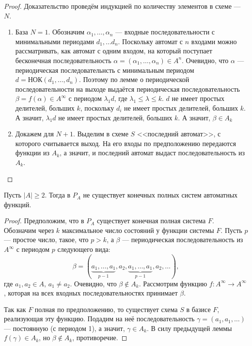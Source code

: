 \begin{proof}
    Доказательство проведём индукцией по количеству элементов в схеме --- $N$.
    \begin{enumerate}
        \item База $N=1$. Обозначим $\alpha_1, \ldots, \alpha_n$ --- входные последовательности с минимальными периодами $d_1, \ldots d_n$. Поскольку автомат с $n$ входами можно рассматривать, как автомат с одним входом, на который поступает бесконечная последовательность $\alpha = (\alpha_1, \ldots, \alpha_n) \in A^n$. Очевидно, что $\alpha$ --- периодическая последовательнсть с минимальным периодом $d= НОК(d_1, \ldots, d_n)$. Поэтому по лемме о периодической последовательности на выходе выдаётся периодическая последовательность $\beta = f(\alpha) \in A^{\infty}$ с периодом $\lambda_1 d$, где $\lambda_1 \leqslant \lambda \leqslant k$. $d$ не имеет простых делителей, больших $k$, поскольку $d_i$ не имеет простых делителей, больших $k$. А значит, $\lambda_1 d$ не имеет простых делителей, больших $k$. А значит, $\beta \in A_k$
        \item Докажем для $N+1$. Выделим в схеме $S$ <<последний автомат>>, с которого считывается выход. На его входы по предположению передаются функции из $A_k$, а значит, и последний автомат выдаст последовательность из $A_k$.
    \end{enumerate}
\end{proof}

\begin{theorem}
    Пусть $|A|\geqslant 2$. Тогда в $P_A$ не существует конечных полных систем автоматных функций.
\end{theorem}

\begin{proof}
    Предположим, что в $P_A$ существует конечная полная система $F$. Обозначим через $k$ максимальное число состояний у функции системы $F$.
    Пусть $p$ --- простое число, такое, что $p>k$, а $\beta$ --- периодическая последовательность из $A^\infty$ с периодом $p$ следующего вида:
    \[
        \beta = (\underbrace{a_1, \ldots, a_1}_{p-1}, a_2, \underbrace{a_1, \ldots, a_1}_{p-1}, a_2, \ldots),
    \]
    где $a_1, a_2 \in A$, $a_1 \neq a_2$. Очевидно, что $\beta \notin A_k$. Рассмотрим функцию $f:A^\infty \to A^\infty$, которая на всех входных последовательностях принимает $\beta$.
    
    Так как $F$ полная по предположению, то существует схема $S$ в базисе $F$, реализующая эту функцию. Подадим на неё последовательность $\gamma = (a_1, a_1, \ldots)$ --- постоянную (с периодом 1), а значит, $\gamma \in A_k$. В силу предыдущей леммы $f(\gamma) \in A_k$, но $\beta \notin A_k$, противоречие.
\end{proof}